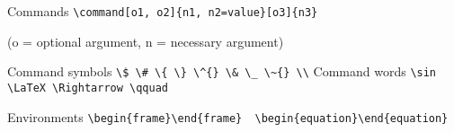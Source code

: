 
\begin{frame}[fragile]{Commands}
    \lstinline[basicstyle=\tt\large]|\command[o1, o2]{n1, n2=value}[o3]{n3}|\par
    (o = optional argument, n = necessary argument)~\\[2ex]

\pause

    {\csk Command symbols}
    \verb|\$ \# \{ \} \^{} \& \_ \~{} \\|
    \vfil
    {\csk Command words}
    \verb|\sin \LaTeX \Rightarrow \qquad|
    
    {\csk Environments}
    \verb|\begin{frame}\end{frame}  \begin{equation}\end{equation}|
    
\end{frame}